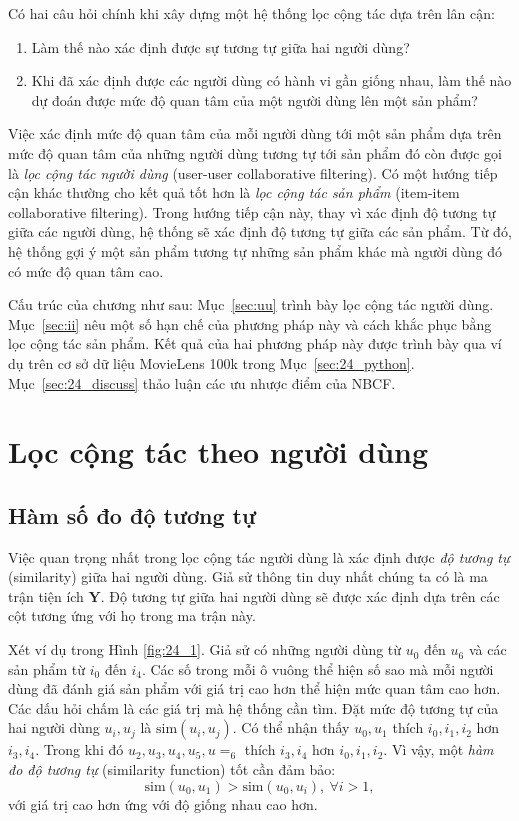 Có hai câu hỏi chính khi xây dựng một hệ thống lọc cộng tác dựa trên lân cận:
\begin{enumerate}
    \item Làm thế nào xác định được {sự tương tự} giữa hai người dùng?
    \item Khi đã xác định được các người dùng có hành vi {gần giống nhau}, làm thế nào dự đoán được {mức độ quan tâm} của một người dùng lên một sản phẩm?
\end{enumerate}
 
Việc xác định mức độ quan tâm của mỗi người dùng tới một sản phẩm dựa trên mức
độ quan tâm của những người dùng tương tự tới sản phẩm đó còn được gọi là
\textit{lọc cộng tác người dùng} (user-user collaborative filtering). Có
một hướng tiếp cận khác thường cho kết quả tốt hơn là \textit{lọc cộng tác
sản phẩm} (item-item collaborative filtering). Trong hướng tiếp cận này, thay vì
xác định độ tương tự giữa các người dùng, hệ thống sẽ xác định độ tương tự
giữa các sản phẩm. Từ đó, hệ thống gợi ý một sản phẩm tương tự những sản phẩm
khác mà người dùng đó có mức độ quan tâm cao.
 
Cấu trúc của chương như sau: Mục~\ref{sec:uu} trình bày lọc cộng tác người
dùng. Mục~\ref{sec:ii} nêu một số hạn chế của phương pháp này và cách khắc phục
bằng lọc cộng tác sản phẩm. Kết quả của hai phương pháp này được trình bày
qua ví dụ trên cơ sở dữ liệu MovieLens 100k trong Mục~\ref{sec:24_python}.
Mục~\ref{sec:24_discuss} thảo luận các ưu nhược điểm của NBCF.
 
 
\section{Lọc cộng tác theo người dùng}
\label{sec:uu}
\subsection{Hàm số đo độ tương tự}
Việc quan trọng nhất trong lọc cộng tác người dùng là xác định được
\textit{độ tương tự} ({similarity}) giữa hai người dùng. Giả sử thông tin duy
nhất chúng ta có là ma trận tiện ích $\mathbf{Y}$. Độ tương tự giữa hai người
dùng sẽ được xác định dựa trên các cột tương ứng với họ trong ma trận này.

Xét ví dụ trong Hình \ref{fig:24_1}. Giả sử có những người dùng từ $u_0$ đến
$u_6$ và các sản phẩm từ $i_0$ đến $i_4$.  Các số trong mỗi ô vuông thể hiện {số
sao} mà mỗi người dùng đã đánh giá sản phẩm với giá trị cao hơn thể hiện {mức
quan tâm} cao hơn. Các dấu hỏi chấm là các giá trị mà hệ thống cần tìm. Đặt {mức
độ tương tự} của hai người dùng $u_i, u_j$ là $\text{sim}(u_i, u_j)$. Có thể
nhận thấy $u_0, u_1$ {thích} $i_0, i_1, i_2$ hơn $i_3, i_4$. Trong khi đó $u_2,
u_3, u_4, u_5, u=_6$ thích $i_3, i_4$ hơn $i_0, i_1, i_2$. Vì vậy, một
\textit{hàm đo độ tương tự} ({similarity function}) tốt cần đảm bảo:
\begin{equation}
\text{sim}(u_0, u_1) > \text{sim}(u_0, u_i), ~\forall i > 1,
\end{equation} 
với giá trị cao hơn ứng với độ giống nhau cao hơn. 

